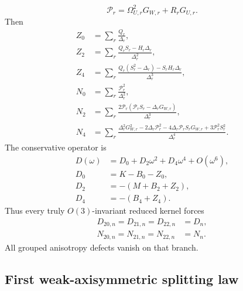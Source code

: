 \begin{equation}
\mathcal P_r=\Omega_{U,r}^2G_{W,r}+R_rG_{U,r}.
\end{equation}
Then
\begin{equation}
\label{eq:part02-ZN-isotropic}
\boxed{
\begin{aligned}
Z_0&=\sum_r\frac{Q_r}{\Delta_r},\\
Z_2&=\sum_r\frac{Q_rS_r-H_r\Delta_r}{\Delta_r^2},\\
Z_4&=\sum_r\frac{Q_r(S_r^2-\Delta_r)-S_rH_r\Delta_r}{\Delta_r^3},\\
N_0&=\sum_r\frac{\mathcal P_r^2}{\Delta_r^2},\\
N_2&=\sum_r\frac{2\mathcal P_r(\mathcal P_rS_r-\Delta_rG_{W,r})}{\Delta_r^3},\\
N_4&=\sum_r\frac{\Delta_r^2G_{W,r}^2-2\Delta_r\mathcal P_r^2-4\Delta_r\mathcal P_rS_rG_{W,r}+3\mathcal P_r^2S_r^2}{\Delta_r^4}.
\end{aligned}
}
\end{equation}
The conservative operator is
\begin{equation}
\label{eq:part02-D-isotropic-stage7}
\boxed{
\begin{aligned}
D(\omega)&=D_0+D_2\omega^2+D_4\omega^4+O(\omega^6),\\
D_0&=K-B_0-Z_0,\\
D_2&=-(M+B_2+Z_2),\\
D_4&=-(B_4+Z_4).
\end{aligned}
}
\end{equation}
Thus every truly \(O(3)\)-invariant reduced kernel forces
\begin{equation}
\label{eq:part02-isotropy-collapse}
\boxed{
\begin{aligned}
D_{20,n}=D_{21,n}=D_{22,n}&=D_n,\\
N_{20,n}=N_{21,n}=N_{22,n}&=N_n.
\end{aligned}
}
\end{equation}
All grouped anisotropy defects vanish on that branch.

\subsection{First weak-axisymmetric splitting law}
\label{subsec:part02-axisymmetric-splitting}

